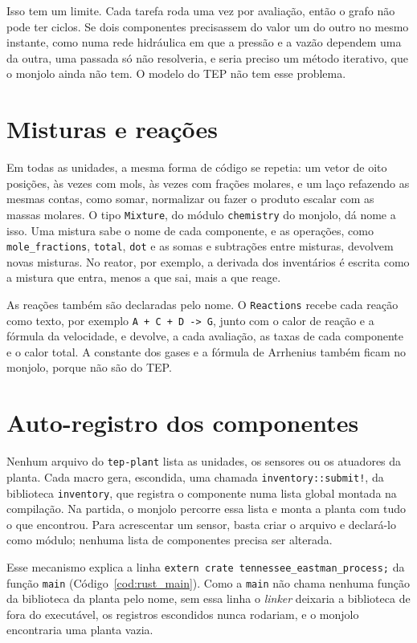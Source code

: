 Isso tem um limite. Cada tarefa roda uma vez por avaliação, então o grafo não pode ter ciclos. Se dois componentes precisassem do valor um do outro no mesmo instante, como numa rede hidráulica em que a pressão e a vazão dependem uma da outra, uma passada só não resolveria, e seria preciso um método iterativo, que o monjolo ainda não tem. O modelo do TEP não tem esse problema.

\section{Misturas e reações}
\label{apC:mistura}

Em todas as unidades, a mesma forma de código se repetia: um vetor de oito posições, às vezes com mols, às vezes com frações molares, e um laço refazendo as mesmas contas, como somar, normalizar ou fazer o produto escalar com as massas molares. O tipo \texttt{Mixture}, do módulo \texttt{chemistry} do monjolo, dá nome a isso. Uma mistura sabe o nome de cada componente, e as operações, como \texttt{mole\_fractions}, \texttt{total}, \texttt{dot} e as somas e subtrações entre misturas, devolvem novas misturas. No reator, por exemplo, a derivada dos inventários é escrita como a mistura que entra, menos a que sai, mais a que reage.

As reações também são declaradas pelo nome. O \texttt{Reactions} recebe cada reação como texto, por exemplo \texttt{A + C + D -> G}, junto com o calor de reação e a fórmula da velocidade, e devolve, a cada avaliação, as taxas de cada componente e o calor total. A constante dos gases e a fórmula de Arrhenius também ficam no monjolo, porque não são do TEP.

\section{Auto-registro dos componentes}
\label{apC:registro_auto}

{\sloppy Nenhum arquivo do \texttt{tep-plant} lista as unidades, os sensores ou os atuadores da planta. Cada macro gera, escondida, uma chamada \texttt{inventory::submit!}, da biblioteca \texttt{inventory}, que registra o componente numa lista global montada na compilação. Na partida, o monjolo percorre essa lista e monta a planta com tudo o que encontrou. Para acrescentar um sensor, basta criar o arquivo e declará-lo como módulo; nenhuma lista de componentes precisa ser alterada.\par}

Esse mecanismo explica a linha \texttt{extern crate tennessee\_eastman\_process;} da função \texttt{main} (Código~\ref{cod:rust_main}). Como a \texttt{main} não chama nenhuma função da biblioteca da planta pelo nome, sem essa linha o \textit{linker} deixaria a biblioteca de fora do executável, os registros escondidos nunca rodariam, e o monjolo encontraria uma planta vazia.

